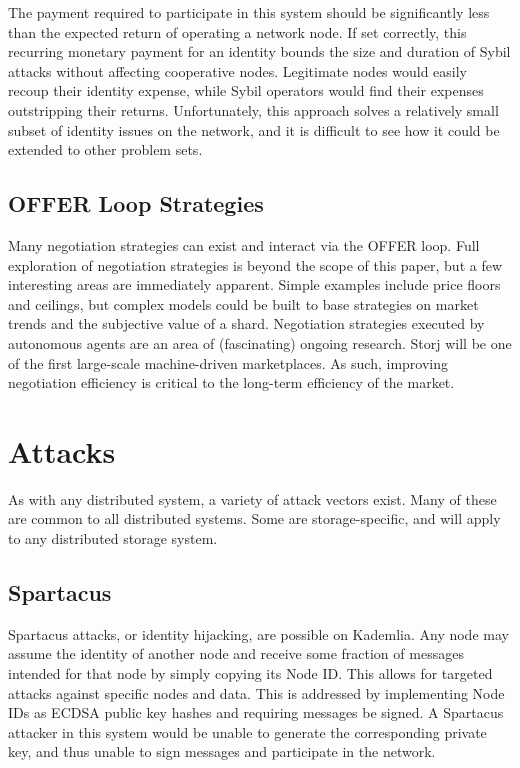 \documentclass[a4paper,10pt]{article}
\begin{document}
The payment required to participate in this system should be significantly less than the expected return of operating a network node. If set correctly, this recurring monetary payment for an identity bounds the size and duration of Sybil attacks without affecting cooperative nodes. Legitimate nodes would easily recoup their identity expense, while Sybil operators would find their expenses outstripping their returns. Unfortunately, this approach solves a relatively small subset of identity issues on the network, and it is difficult to see how it could be extended to other problem sets.

\subsection{OFFER Loop Strategies}
Many negotiation strategies can exist and interact via the OFFER loop. Full exploration of negotiation strategies is beyond the scope of this paper, but a few interesting areas are immediately apparent. Simple examples include price floors and ceilings, but complex models could be built to base strategies on market trends and the subjective value of a shard. Negotiation strategies executed by autonomous agents are an area of (fascinating) ongoing research. Storj will be one of the first large-scale machine-driven marketplaces. As such, improving negotiation efficiency is critical to the long-term efficiency of the market.

\section{Attacks}
As with any distributed system, a variety of attack vectors exist. Many of these are common to all distributed systems. Some are storage-specific, and will apply to any distributed storage system.

\subsection{Spartacus}
Spartacus attacks, or identity hijacking, are possible on Kademlia. Any node may assume the identity of another node and receive some fraction of messages intended for that node by simply copying its Node ID. This allows for targeted attacks against specific nodes and data. This is addressed by implementing Node IDs as ECDSA public key hashes and requiring messages be signed. A Spartacus attacker in this system would be unable to generate the corresponding private key, and thus unable to sign messages and participate in the network.
\end{document}
